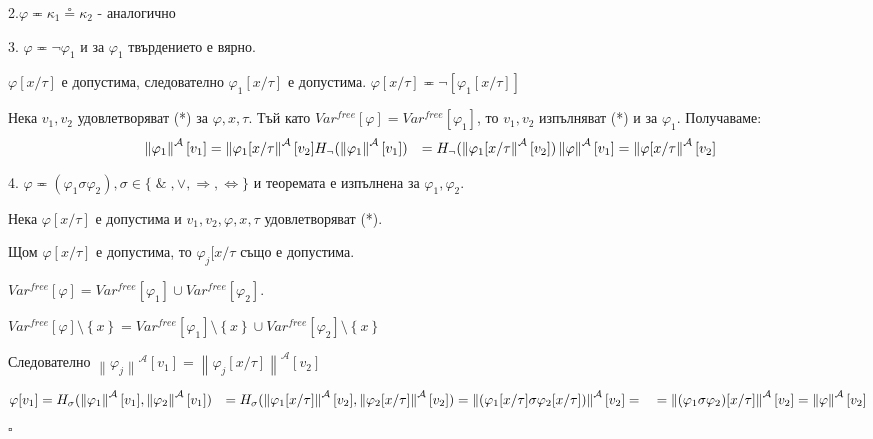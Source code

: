 \documentclass{article}
\renewcommand{\\}{\newline}
\newcommand{\amp}{\;\&\;}
\newcommand{\proven}{\hfill $\square$}
\begin{document}
2.\(\varphi \eqcirc \kappa_1 \circeq \kappa_2\) - аналогично 

3. \(\varphi \eqcirc \lnot \varphi_1  \) и за \(\varphi_1\) твърдението е вярно. 

\(\varphi[x/\tau]\) е допустима, следователно \(\varphi_1[x/\tau]\) е допустима. \(\varphi[x/\tau] \eqcirc \lnot[\varphi_1[x/\tau]]\)  

Нека \(v_1, v_2\) удовлетворяват (*) за \(\varphi, x, \tau\). Тъй като \(Var^{free}[\varphi] = Var^{free}[\varphi_1]\), то \(v_1, v_2\) изпълняват (*) и за \(\varphi_1\). Получаваме: \begin{align*}
  \left\|\varphi_1\right\|^{\mathcal{A}}[v_1] &= \left\|\varphi_1[x/\tau\right\|^{\mathcal{A}}[v_2] \\ 
  H_{\lnot}(\left\|\varphi_1\right\|^{\mathcal{A}}[v_1]) &= H_{\lnot}(\left\|\varphi_1[x/\tau\right\|^{\mathcal{A}}[v_2]) \\ 
  \left\|\varphi\right\|^{\mathcal{A}}[v_1] &= \left\|\varphi[x/\tau\right\|^{\mathcal{A}}[v_2] \\ 
\end{align*}     
  
4. \(\varphi \eqcirc (\varphi_1 \sigma \varphi_2), \sigma \in \{\amp, \lor, \Rightarrow, \iff\}\) и теоремата е изпълнена за \(\varphi_1, \varphi_2\). 

Нека \(\varphi[x/\tau]\) е допустима и \(v_1, v_2, \varphi, x, \tau\) удовлетворяват (*).   

Щом \(\varphi[x/\tau]\) е допустима, то \(\varphi_j[x/\tau\) също е допустима. 

\(Var^{free}[\varphi] = Var^{free}[\varphi_1] \cup Var^{free}[\varphi_2]\). 

\(Var^{free}[\varphi]\setminus \left\{x\right\} = Var^{free}[\varphi_1]\setminus \left\{x\right\} \cup Var^{free}[\varphi_2]\setminus \left\{x\right\}\)  

Следователно \(\left\|\varphi_j\right\|^{\mathcal{A}}[v_1] = \left\|\varphi_j[x/\tau]\right\|^{\mathcal{A}}[v_2]\)  

\begin{align*}
  \varphi[v_1] &= H_{\sigma}(\left\|\varphi_1\right\|^{\mathcal{A}}[v_1],\left\|\varphi_2\right\|^{\mathcal{A}}[v_1]) \\
               &= H_{\sigma}(\left\|\varphi_1[x/\tau]\right\|^{\mathcal{A}}[v_2],\left\|\varphi_2[x/\tau]\right\|^{\mathcal{A}}[v_2]) \\
               &= \left\|(\varphi_1[x/\tau]\sigma \varphi_2[x/\tau])\right\|^{\mathcal{A}}[v_2] = \\ 
               &= \left\|(\varphi_1 \sigma \varphi_2)[x/\tau]\right\|^{\mathcal{A}}[v_2] = \left\|\varphi\right\|^{\mathcal{A}}[v_2]
\end{align*}
\proven 
\newpage
\end{document}
